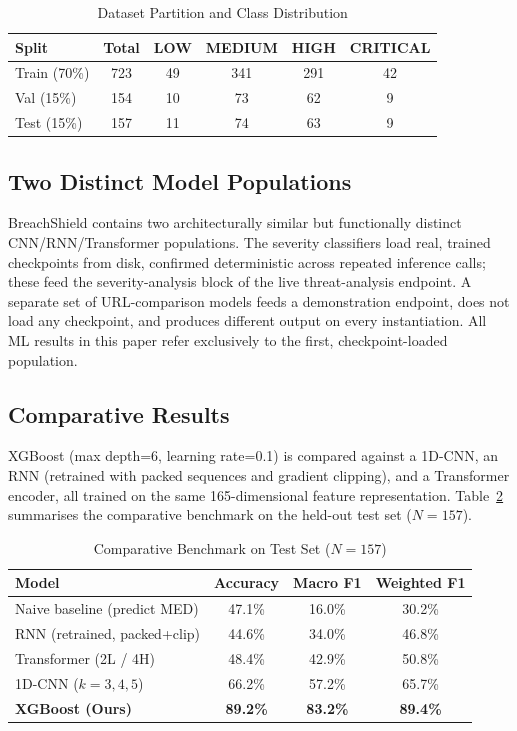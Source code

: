 \documentclass[conference]{IEEEtran}
\begin{document}
\begin{table}[htbp]
\caption{Dataset Partition and Class Distribution}
\label{tab:split}
\centering
\scriptsize
\begin{tabular}{lccccc}
\toprule
\textbf{Split} & \textbf{Total} & \textbf{LOW} & \textbf{MEDIUM} & \textbf{HIGH} & \textbf{CRITICAL} \\
\midrule
Train (70\%) & 723 & 49 & 341 & 291 & 42 \\
Val (15\%) & 154 & 10 & 73 & 62 & 9 \\
Test (15\%) & 157 & 11 & 74 & 63 & 9 \\
\bottomrule
\end{tabular}
\end{table}

\subsection{Two Distinct Model Populations}
BreachShield contains two architecturally similar but functionally distinct CNN/RNN/Transformer populations. The severity classifiers load real, trained checkpoints from disk, confirmed deterministic across repeated inference calls; these feed the severity-analysis block of the live threat-analysis endpoint. A separate set of URL-comparison models feeds a demonstration endpoint, does not load any checkpoint, and produces different output on every instantiation. All ML results in this paper refer exclusively to the first, checkpoint-loaded population.

\subsection{Comparative Results}
XGBoost \cite{chen2016xgboost} (max depth=6, learning rate=0.1) is compared against a 1D-CNN, an RNN (retrained with packed sequences and gradient clipping), and a Transformer encoder, all trained on the same 165-dimensional feature representation. Table~\ref{tab:benchmark} summarises the comparative benchmark on the held-out test set ($N=157$).

\begin{table}[htbp]
\caption{Comparative Benchmark on Test Set ($N=157$)}
\label{tab:benchmark}
\centering
\scriptsize
\begin{tabular}{lccc}
\toprule
\textbf{Model} & \textbf{Accuracy} & \textbf{Macro F1} & \textbf{Weighted F1} \\
\midrule
Naive baseline (predict MED) & 47.1\% & 16.0\% & 30.2\% \\
RNN (retrained, packed+clip) & 44.6\% & 34.0\% & 46.8\% \\
Transformer (2L / 4H) & 48.4\% & 42.9\% & 50.8\% \\
1D-CNN ($k=3,4,5$) & 66.2\% & 57.2\% & 65.7\% \\
\textbf{XGBoost (Ours)} & \textbf{89.2\%} & \textbf{83.2\%} & \textbf{89.4\%} \\
\bottomrule
\end{tabular}
\end{table}
\end{document}
